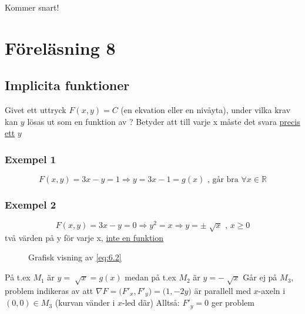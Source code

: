 \documentclass{article}
\let\oldsqrt\sqrt
\renewcommand*{\sqrt}[2][\ ]{\oldsqrt[#1]{#2} }
\begin{document}
Kommer snart!

\newpage
\section{Föreläsning 8}
\subsection{Implicita funktioner}

Givet ett uttryck \(F(x,y)=C\) (en ekvation eller en nivåyta), under vilka krav kan \(y\) lösas ut som en funktion av ? \newline
Betyder att till varje x måste det svara \underline{precis ett} \(y\)

\subsubsection{Exempel 1}
\begin{equation} \label{eq:6.1}
	F(x,y) = 3x-y = 1 \Rightarrow y = 3x-1 = g(x) \text{ , går bra } \forall x \in \mathbb{R}
\end{equation}

\subsubsection{Exempel 2}
\begin{equation} \label{eq:6.2}
	F(x,y) = 3x-y = 0 \Rightarrow y^2 = x \Rightarrow y = \pm \sqrt{x} \text{ , } x \geq 0
\end{equation}
två värden på y för varje x, \underline{inte en funktion}

\begin{figure}[ht] 
  \caption{Grafisk visning av \eqref{eq:6.2}} \label{fig:6.1}
\end{figure}

På t.ex \(M_1\) är \(y = \sqrt{x} = g(x)\) medan på t.ex \(M_2\) är \(y = -\sqrt{x}\) \newline
Går ej på \(M_3\), problem indikeras av att \(\nabla F = \Big(F'_x,F'_y\Big) = \Big(1,-2y\Big)\) är parallell med \(x\)-axeln i \((0,0) \in M_3\) (kurvan vänder i \(x\)-led där) \newline
Alltså: \(F'_y = 0\) ger problem
\end{document}
